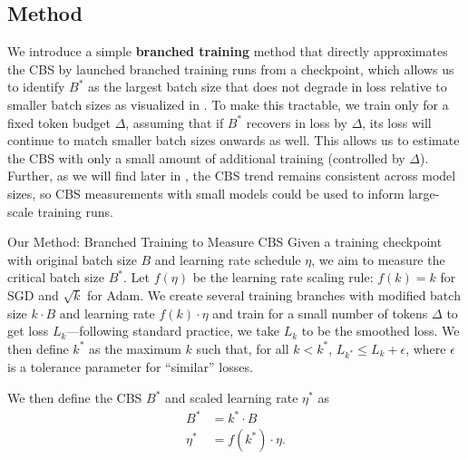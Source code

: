 \documentclass{article}
\renewcommand{\paragraph}[1]{\noindent \textbf{#1}}
\newcommand{\hanna}[1]{\textcolor{purple}{[Hanna]: #1}}
\begin{document}
\subsection{Method}

We introduce a simple \textbf{branched training} method that directly approximates the CBS by launched branched training runs from a checkpoint, which allows us to identify $B^*$ as the largest batch size that does not degrade in loss relative to smaller batch sizes as visualized in . 
To make this tractable, we train only for a fixed token budget $\Delta$, assuming that if $B^*$ recovers in loss by $\Delta$, its loss will continue to match smaller batch sizes onwards as well.
This allows us to estimate the CBS with only a small amount of additional training (controlled by $\Delta$). 
Further, as we will find later in , the CBS trend remains consistent across model sizes, so CBS measurements with small models could be used to inform large-scale training runs.



\begin{methodbox}{Our Method: Branched Training to Measure CBS} \label{box:empirical-cbs}
    Given a training checkpoint with original batch size $B$ and learning rate schedule $\eta$, we aim to measure the critical batch size $B^*$.
    Let $f(\eta)$ be the learning rate scaling rule: $f(k) = k$ for SGD and $\sqrt{k}$ for Adam.
    We create several training branches with modified batch size $k \cdot B$ and learning rate $f(k) \cdot \eta$ and train for a small number of tokens $\Delta$ to get loss $L_k$---following standard practice, we take $L_k$ to be the smoothed loss.
    We then define $k^*$ as the maximum $k$ such that, for all $k < k^*$, $L_{k^*} \leq L_k + \epsilon$, where $\epsilon$ is a tolerance parameter for ``similar'' losses.
    
    \paragraph{} We  then define the CBS $B^*$ and scaled learning rate $\eta^*$ as
    \begin{align*}
        B^* &= k^* \cdot B \\
        \eta^* &= f(k^*) \cdot \eta .
    \end{align*}
\end{methodbox}
\end{document}
